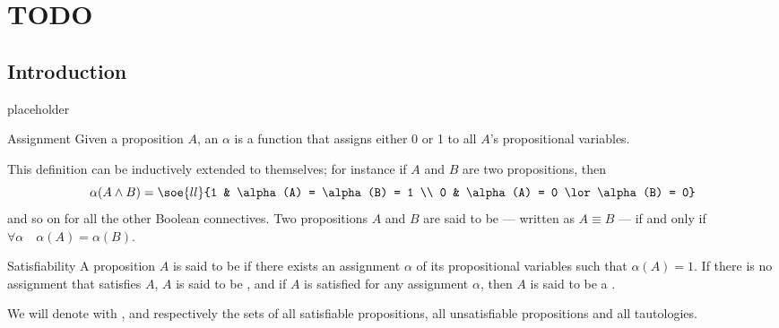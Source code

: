 \documentclass[a4paper, 12pt]{report}
\institute{\curlyquotes{\hspace{0.25mm}Sapienza} Università di Roma}
\subtitle{Appunti integrati con il libro \book}
\author{\textit{Autore}\\\authorName}
\institute{\curlyquotes{\hspace{0.25mm}Sapienza} University of Rome}
\subtitle{Lecture notes integrated with the book \book}
\author{\textit{Author}\\\authorName}
\title{\courseName}
\date{\today}
\begin{document}
    \maketitle

    {
        \hypersetup{allcolors=black}

        \romantableofcontents
    }

    \introduction


    \chapter{TODO}

    \section{Introduction}

    placeholder 

    \begin{frameddefn}{Assignment}
        Given a proposition $A$, an  $\alpha$ is a function that assigns either 0 or 1 to all $A$'s propositional variables.
    \end{frameddefn}

    This definition can be inductively extended to  themselves; for instance if $A$ and $B$ are two propositions, then $$\alpha(A \land B) = \soe{ll}{1 & \alpha(A) = \alpha(B) = 1 \\ 0 & \alpha(A) = 0 \lor \alpha(B) = 0}$$ and so on for all the other Boolean connectives. Two propositions $A$ and $B$ are said to be  --- written as $A \equiv B$ --- if and only if $\forall \alpha \quad \alpha(A) = \alpha(B)$.

    \begin{frameddefn}{Satisfiability}
        A proposition $A$ is said to be  if there exists an assignment $\alpha$ of its propositional variables such that $\alpha(A) = 1$. If there is no assignment that satisfies $A$, $A$ is said to be , and if $A$ is satisfied for any assignment $\alpha$, then $A$ is said to be a .

        We will denote with \SAT, \UNSAT and \TAUT respectively the sets of all satisfiable propositions, all unsatisfiable propositions and all tautologies.
    \end{frameddefn}
\end{document}
